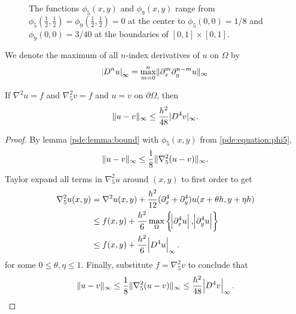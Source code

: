 \begin{figure}[t]
\centering
{}
\caption{\label{pde:figure:phi}The functions $\phi_5(x,y)$ and $\phi_9(x,y)$ range from $\phi_5(\frac12,\frac12)=\phi_9(\frac12,\frac12)=0$ at the center to $\phi_5(0,0) = 1/8$ and $\phi_9(0,0)=3/40$ at the boundaries of $[0,1]\times[0,1]$.}
\end{figure}

\begin{definition}
  We denote the maximum of all $n$-index derivatives of $u$ on $\Omega$ by
  \begin{equation*}
  \abs{D^n u}_\infty = \max_{m=0}^n \lVert \partial_x^m \partial_y^{n-m} u \rVert_\infty
  \end{equation*}
\end{definition}

\begin{theorem}\label{thm:five}
If $\nabla^2 u = f$ and $\nabla_5^2 v = f$ and $u = v$ on $\partial \Omega$, then
$$
\lVert u - v \rVert_\infty \leq \frac{h^2}{48} \lvert D^4 v\rvert_\infty.
$$
\end{theorem}
\begin{proof}
By lemma \ref{pde:lemma:bound} with $\phi_5(x,y)$ from \ref{pde:equation:phi5},
$$
\lVert u - v \rVert_\infty \leq \frac18 \lVert \nabla_5^2 (u  - v) \rVert_\infty.
$$
Taylor expand all terms in $\nabla_5^2 u$ around $(x,y)$ to first order to get
\begin{align*}
  \nabla_5^2 u(x,y)
  &=    \nabla^2 u(x,y) + \frac{h^2}{12} (\partial_x^4 + \partial_y^4) u(x + \theta h, y + \eta h)\\
  &\leq f(x,y)          + \frac{h^2}{6} \max_\Omega\left\{\abs{\partial_x^4 u}, \abs{\partial_y^4 u}\right\} \\
  &\leq f(x,y)          + \frac{h^2}{6} \abs{D^4 u}_\infty.\\
\end{align*}
for some $0 \leq \theta, \eta \leq 1$.
Finally, substitute $f = \nabla_5^2 v$ to conclude that
\begin{equation*}
  \lVert u - v \rVert_\infty
  \leq \frac18 \lVert \nabla_5^2 (u  - v) \rVert_\infty
  \leq \frac{h^2}{48} \abs{D^4 v}_\infty. \qedhere
\end{equation*}
\end{proof}


